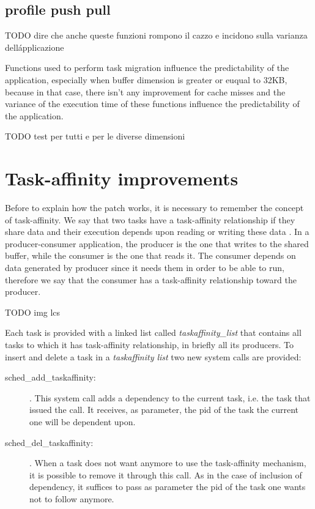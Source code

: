 \subsection{profile push pull}

TODO dire che anche queste funzioni rompono il cazzo e incidono sulla varianza dell\'applicazione

Functions used to perform task migration influence the predictability of the application, especially when buffer dimension is greater or euqual to 32KB, 
because in that case, there isn't any improvement for cache misses and the variance of the execution time of these functions influence the predictability
of the application. 



TODO test per tutti e per le diverse dimensioni





\section{Task-affinity improvements}

Before to explain how the patch works, it is necessary to remember the concept of task-affinity. We say that two tasks have a task-affinity relationship if 
they share data and their execution depends upon reading or writing these data \cite{lcs}. In a producer-consumer application, the producer 
is the one that writes to the shared buffer, while the consumer is the one that reads it. The consumer depends on data generated by producer since it needs 
them in order to be able to run, therefore we say that the consumer has a task-affinity relationship toward the producer.

TODO img lcs

Each task is provided with a linked list called \textit{taskaffinity\_list} that contains all tasks to which it has task-affinity relationship, in briefly 
all its producers. To insert and delete a task in a \textit{taskaffinity list} two new system calls are provided:

\begin{description}

\item[sched\_add\_taskaffinity:]. This system call adds a dependency to the current task, i.e. the task that issued the call. It receives, as parameter, the 
pid of the task the current one will be dependent upon.

\item[sched\_del\_taskaffinity:]. When a task does not want anymore to use the task-affinity mechanism, it is possible to remove it through this call.
As in the case of inclusion of dependency, it suffices to pass as parameter the pid of the task one wants not to follow anymore.

\end{description}

